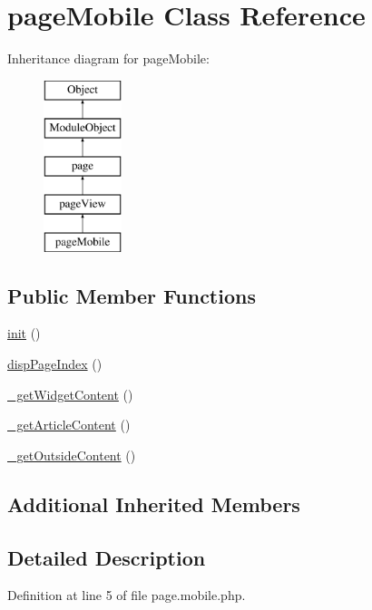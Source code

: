 \hypertarget{classpageMobile}{}\section{page\+Mobile Class Reference}
\label{classpageMobile}
Inheritance diagram for page\+Mobile\+:\begin{figure}[H]
\begin{center}
\leavevmode
\includegraphics[height=5.000000cm]{classpageMobile}
\end{center}
\end{figure}
\subsection*{Public Member Functions}
\begin{DoxyCompactItemize}
\item 
\hyperlink{classpageMobile_a5dd50db2aed4a910e6dcd1178f55e9c1}{init} ()
\item 
\hyperlink{classpageMobile_abefd2674d7ecf5462aaeb0194aac495a}{disp\+Page\+Index} ()
\item 
\hyperlink{classpageMobile_a5e65e98a19965434e96d015d758a6e04}{\+\_\+get\+Widget\+Content} ()
\item 
\hyperlink{classpageMobile_a1db84b18401fa8f49a453908b65e3cb0}{\+\_\+get\+Article\+Content} ()
\item 
\hyperlink{classpageMobile_ac66b4cd03a329d1d64823f623d8e6fd2}{\+\_\+get\+Outside\+Content} ()
\end{DoxyCompactItemize}
\subsection*{Additional Inherited Members}


\subsection{Detailed Description}


Definition at line 5 of file page.\+mobile.\+php.



